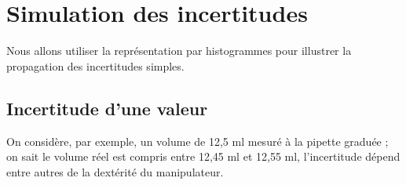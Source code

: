 \section{Simulation des incertitudes}
Nous allons utiliser la représentation par histogrammes pour illustrer la propagation des incertitudes simples.
\subsection{Incertitude d'une valeur}
On considère, par exemple, un volume de 12,5 ml mesuré à la pipette graduée ; on sait le volume réel est compris entre 12,45 ml et 12,55 ml, l'incertitude dépend entre autres de la dextérité du manipulateur.

